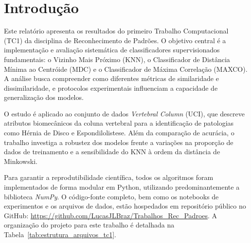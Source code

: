 \section{Introdução}
\label{cap:introducao}

Este relatório apresenta os resultados do primeiro Trabalho Computacional (TC1) da disciplina de Reconhecimento de Padrões. O objetivo central é a implementação e avaliação sistemática de classificadores supervisionados fundamentais: o Vizinho Mais Próximo (KNN), o Classificador de Distância Mínima ao Centróide (MDC) e o Classificador de Máxima Correlação (MAXCO). A análise busca compreender como diferentes métricas de similaridade e dissimilaridade, e protocolos experimentais influenciam a capacidade de generalização dos modelos.

O estudo é aplicado ao conjunto de dados \textit{Vertebral Column} (UCI), que descreve atributos biomecânicos da coluna vertebral para a identificação de patologias como Hérnia de Disco e Espondilolistese. Além da comparação de acurácia, o trabalho investiga a robustez dos modelos frente a variações na proporção de dados de treinamento e a sensibilidade do KNN à ordem da distância de Minkowski.

Para garantir a reprodutibilidade científica, todos os algoritmos foram implementados de forma modular em Python, utilizando predominantemente a biblioteca \textit{NumPy}. O código-fonte completo, bem como os notebooks de experimentos e os arquivos de dados, estão hospedados em repositório público no GitHub: \url{https://github.com/LucasJLBraz/Trabalhos_Rec_Padroes}. A organização do projeto para este trabalho é detalhada na Tabela~\ref{tab:estrutura_arquivos_tc1}.

\begin{table}[h!]
\centering
\caption{Estrutura de diretórios e arquivos para o Trabalho Computacional 1.}
\label{tab:estrutura_arquivos_tc1}
\end{table}
